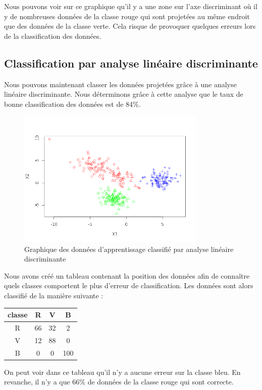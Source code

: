\documentclass[a4paper,11pt]{article}
\begin{document}
  Nous pouvons voir sur ce graphique qu'il y a une zone sur l'axe discriminant où il y de nombreuses
  données de la classe rouge qui sont projetées au même endroit que des données de la classe verte.
  Cela risque de provoquer quelques erreurs lors de la classification des données.
  
  \subsection{Classification par analyse linéaire discriminante}
  
  Nous pouvons maintenant classer les données projetées grâce à une analyse linéaire discriminante. Nous 
  déterminons grâce à cette analyse que le taux de bonne classification des données est de 84\%.
  
  \begin{figure}[H]
  \center
   \includegraphics[width=9cm]{apprentissage_classifie.png}
   \caption{Graphique des données d'apprentissage classifié par analyse linéaire discriminante}
  \end{figure}

  Nous avons créé un tableau contenant la position des données afin de connaître quels classes
  comportent le plus d'erreur de classification. Les données sont alors classifié de la manière suivante :
  \begin{center}
  \begin{tabular}{|c|c|c|c|}
   \hline
   classe & R & V & B\\
   \hline
   R & 66 & 32 & 2 \\
   \hline
   V & 12 & 88 & 0 \\
   \hline
   B & 0 & 0 & 100 \\
   \hline
  \end{tabular}
  \end{center}

  On peut voir dans ce tableau qu'il n'y a aucune erreur sur la classe bleu. En revanche, il n'y a que 66\%
  de données de la classe rouge qui sont correcte.\\
  
\end{document}
